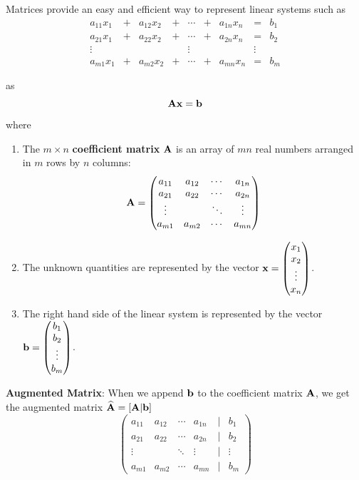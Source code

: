 \documentclass[]{book}
\theoremstyle{definition}
\theoremstyle{definition}
\theoremstyle{definition}
\theoremstyle{remark}
\begin{document}
Matrices provide an easy and efficient way to represent linear systems
such as \[\begin{matrix}
        a_{11}x_1  & + & a_{12}x_2 & + & \cdots & + & a_{1n}x_n & = & b_1\\
        a_{21}x_1  & + & a_{22}x_2 & + & \cdots & + & a_{2n}x_n & = & b_2\\
        \vdots     &   &     &   & \vdots &   &     & \vdots & \\
        a_{m1}x_1  & + & a_{m2}x_2 & + & \cdots & + & a_{mn}x_n & = & b_m
        \end{matrix}\]

as \[{\bf A x = b}\] where

\begin{enumerate}

\item The $m \times n$ \textbf{coefficient matrix} ${\bf A}$ is an array of $m n$  real numbers arranged in $m$ rows by $n$ columns:
            $${\bf A}=\begin{pmatrix}
            a_{11} & a_{12} & \cdots & a_{1n} \\
            a_{21} & a_{22} & \cdots & a_{2n} \\
            \vdots &  & \ddots & \vdots \\
            a_{m1} & a_{m2} & \cdots & a_{mn}
            \end{pmatrix}$$

        \item The unknown quantities are represented by the vector ${\bf x}=\begin{pmatrix} x_1\\x_2\\\vdots\\x_n \end{pmatrix}$.
        \item The right hand side of the linear system is represented by the vector ${\bf b}=\begin{pmatrix} b_1\\b_2\\\vdots\\b_m \end{pmatrix}$.
    \end{enumerate}

\textbf{Augmented Matrix}: When we append \(\bf b\) to the coefficient
matrix \(\bf A\), we get the augmented matrix
\(\widehat{\bf A}=[\bf A | b]\) \[\begin{pmatrix}
            a_{11} & a_{12} & \cdots & a_{1n} & | & b_1\\
            a_{21} & a_{22} & \cdots & a_{2n} & | & b_2\\
            \vdots &  & \ddots & \vdots & | & \vdots\\
            a_{m1} & a_{m2} & \cdots & a_{mn} & | & b_m
            \end{pmatrix}\]
\end{document}
